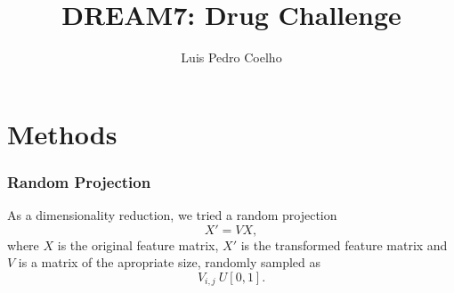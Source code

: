 \documentclass[article,twoside]{memoir}
\title{DREAM7: Drug Challenge}
\author{Luis Pedro Coelho}
\begin{document}
\chapter{Methods}
\subsection{Random Projection}

As a dimensionality reduction, we tried a random projection
\begin{equation}
X' = VX,
\label{eq:rproject}
\end{equation}
where $X$ is the original feature matrix, $X'$ is the transformed feature
matrix and $V$ is a matrix of the apropriate size, randomly sampled as
\begin{equation}
V_{i,j} ~ U[0,1].
\label{eq:rproject:Vij}
\end{equation}
\end{document}
